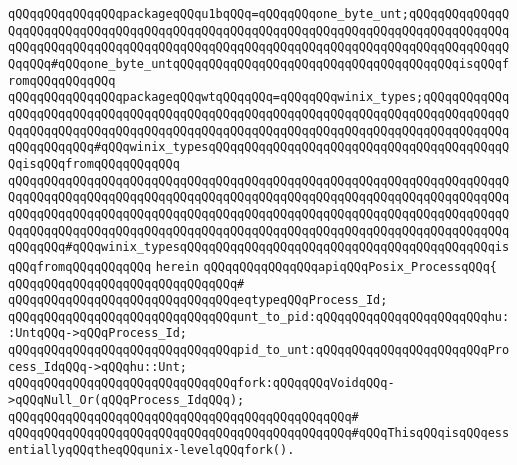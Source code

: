 \verb|qQQqqQQqqQQqqQQqpackageqQQqu1bqQQq=qQQqqQQqone_byte_unt;qQQqqQQqqQQqqQQqqQQqqQQqqQQqqQQqqQQqqQQqqQQqqQQqqQQqqQQqqQQqqQQqqQQqqQQqqQQqqQQqqQQqqQQqqQQqqQQqqQQqqQQqqQQqqQQqqQQqqQQqqQQqqQQqqQQqqQQqqQQqqQQqqQQqqQQqqQQqqQQq#qQQqone_byte_untqQQqqQQqqQQqqQQqqQQqqQQqqQQqqQQqqQQqqQQqisqQQqfromqQQqqQQqqQQq|\newline
\verb|qQQqqQQqqQQqqQQqpackageqQQqwtqQQqqQQq=qQQqqQQqwinix_types;qQQqqQQqqQQqqQQqqQQqqQQqqQQqqQQqqQQqqQQqqQQqqQQqqQQqqQQqqQQqqQQqqQQqqQQqqQQqqQQqqQQqqQQqqQQqqQQqqQQqqQQqqQQqqQQqqQQqqQQqqQQqqQQqqQQqqQQqqQQqqQQqqQQqqQQqqQQqqQQqqQQq#qQQqwinix_typesqQQqqQQqqQQqqQQqqQQqqQQqqQQqqQQqqQQqqQQqqQQqisqQQqfromqQQqqQQqqQQq|\newline
\verb|qQQqqQQqqQQqqQQqqQQqqQQqqQQqqQQqqQQqqQQqqQQqqQQqqQQqqQQqqQQqqQQqqQQqqQQqqQQqqQQqqQQqqQQqqQQqqQQqqQQqqQQqqQQqqQQqqQQqqQQqqQQqqQQqqQQqqQQqqQQqqQQqqQQqqQQqqQQqqQQqqQQqqQQqqQQqqQQqqQQqqQQqqQQqqQQqqQQqqQQqqQQqqQQqqQQqqQQqqQQqqQQqqQQqqQQqqQQqqQQqqQQqqQQqqQQqqQQqqQQqqQQqqQQqqQQqqQQqqQQqqQQqqQQq#qQQqwinix_typesqQQqqQQqqQQqqQQqqQQqqQQqqQQqqQQqqQQqqQQqqQQqisqQQqfromqQQqqQQqqQQq|\newline
\verb|herein|\newline
\newline
\verb|qQQqqQQqqQQqqQQqapiqQQqPosix_ProcessqQQq{|\newline
\verb|qQQqqQQqqQQqqQQqqQQqqQQqqQQqqQQq#|\newline
\verb|qQQqqQQqqQQqqQQqqQQqqQQqqQQqqQQqeqtypeqQQqProcess_Id;|\newline
\newline
\verb|qQQqqQQqqQQqqQQqqQQqqQQqqQQqqQQqunt_to_pid:qQQqqQQqqQQqqQQqqQQqqQQqhu::UntqQQq->qQQqProcess_Id;|\newline
\verb|qQQqqQQqqQQqqQQqqQQqqQQqqQQqqQQqpid_to_unt:qQQqqQQqqQQqqQQqqQQqqQQqProcess_IdqQQq->qQQqhu::Unt;|\newline
\newline
\newline
\verb|qQQqqQQqqQQqqQQqqQQqqQQqqQQqqQQqfork:qQQqqQQqVoidqQQq->qQQqNull_Or(qQQqProcess_IdqQQq);|\newline
\verb|qQQqqQQqqQQqqQQqqQQqqQQqqQQqqQQqqQQqqQQqqQQqqQQq#|\newline
\verb|qQQqqQQqqQQqqQQqqQQqqQQqqQQqqQQqqQQqqQQqqQQqqQQq#qQQqThisqQQqisqQQqessentiallyqQQqtheqQQqunix-levelqQQqfork().|\newline
